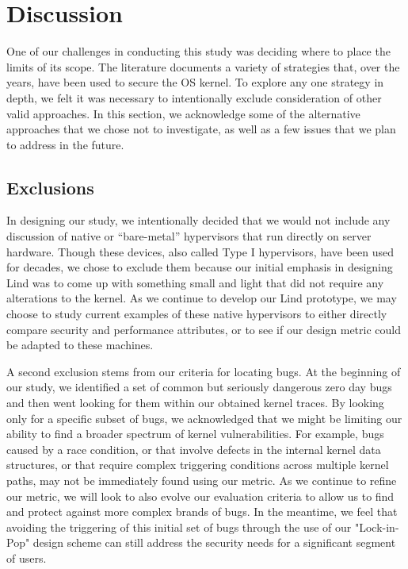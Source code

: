 \section{Discussion}
\label{sec.limitation}

One of our challenges in conducting this study was deciding where to place the
limits of its scope. The literature documents a variety of strategies that, over
the years, have been used to secure the OS kernel. To explore any one strategy
in depth, we felt it was necessary to intentionally exclude consideration of
other valid approaches. In this section, we acknowledge some of the alternative
approaches that we chose not to investigate, as well as a few issues that we plan
to address in the future.

\subsection{Exclusions}
In designing our study, we intentionally decided that we would not include any
discussion of native or “bare-metal” hypervisors that run directly on server
hardware. Though these devices, also called Type I hypervisors, have been used
for decades, we chose to exclude them because our initial emphasis in designing
Lind was to come up with something small and light that did not require any
alterations to the kernel. As we continue to develop our Lind prototype, we may
choose to study current examples of these native hypervisors to either directly
compare security and performance attributes, or to see if our design metric could
be adapted to these machines.

A second exclusion stems from our criteria for locating bugs. At the beginning
of our study, we identified a set of common but seriously dangerous zero day bugs
and then went looking for them within our obtained kernel traces. By looking only
for a specific subset of bugs, we acknowledged that we might be limiting our
ability to find a broader spectrum of kernel vulnerabilities. For example, bugs
caused by a race condition, or that involve defects in the internal kernel data
structures, or that require complex triggering conditions across multiple kernel
paths, may not be immediately found using our metric. As we continue to refine
our metric, we will look to also evolve our evaluation
criteria to allow us to find and protect against more complex brands of bugs.
In the meantime, we feel that avoiding the triggering of this initial set of bugs
through the use of our "Lock-in-Pop" design scheme can still address the security
needs for a significant segment of users.

